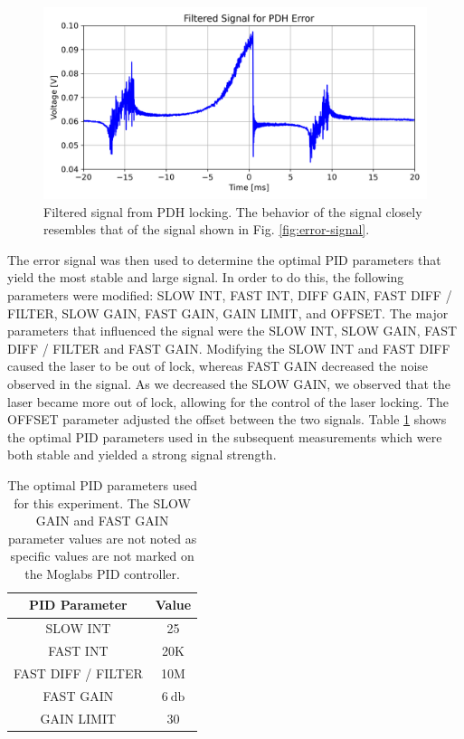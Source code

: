\documentclass[a4paper]{report}
\numberwithin{equation}{section}
\begin{document}
 \begin{figure}[h!]
	\centering
	\includegraphics[width=0.8\columnwidth]{pdh_err_filt.png}
	\caption{Filtered signal from PDH locking. The behavior of the signal closely resembles that of the signal 
	shown in Fig. \ref{fig:error-signal}. }
	\label{fig:pdh_err_filt}
\end{figure}


The error signal was then used to determine the optimal PID parameters that yield the most stable and large signal. In order to 
do this, the following parameters were modified: SLOW INT, FAST INT, DIFF GAIN, FAST DIFF / FILTER, SLOW GAIN, FAST GAIN, GAIN LIMIT, and OFFSET. The major parameters that influenced the signal were the SLOW INT, SLOW GAIN, FAST DIFF / FILTER and FAST GAIN. Modifying the SLOW INT and FAST DIFF caused the laser to be out of lock, whereas FAST GAIN decreased the noise observed in the signal. As we decreased the SLOW GAIN, we observed that the laser became more out of lock, allowing for the control of the laser locking. The OFFSET parameter adjusted the offset between the two signals. Table \ref{tab:pid_params} 
shows the optimal PID parameters used in the subsequent measurements which were both stable and yielded a strong signal strength. \par 

\begin{table}[h!]
	\centering
	\begin{tabular}{|c|c|}
		\hline 
		PID Parameter & Value \\ \hline
		SLOW INT & 25 \\ \hline
		FAST INT & 20K \\ \hline
		FAST DIFF / FILTER & 10M \\ \hline
		FAST GAIN & $\SI{6}{\decibel}$ \\ \hline
		GAIN LIMIT & 30 \\ \hline
	\end{tabular}
	\caption{The optimal PID parameters used for this experiment. The SLOW GAIN and FAST GAIN parameter values are not noted
	as specific values are not marked on the Moglabs PID controller.}
	\label{tab:pid_params}
\end{table}
\end{document}
